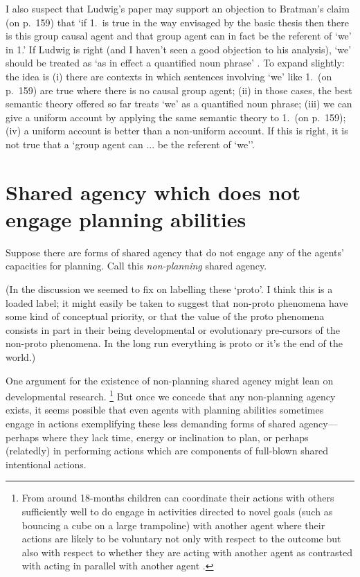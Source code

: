 \documentclass[12pt,letterpaper]{extarticle}
\begin{document}
I also suspect that Ludwig's paper may support an objection to Bratman's claim (on p.\ 159) that `if 1.\ is true in the way envisaged by the basic thesis then there is this group causal agent and that group agent can in fact be the referent of `we' in 1.'
If Ludwig is right (and I haven't seen a good objection to his analysis), `we' should be treated as `as in effect a quantified noun phrase' \citep[p.\ 364]{ludwig_collective_2007}.
To expand slightly: the idea is (i) there are contexts in which sentences involving `we' like 1.\ (on p.\ 159) are true where there is no causal group agent; (ii) in those cases, the best semantic theory offered so far treats `we' as a quantified noun phrase; (iii) we can give a uniform account by applying the same semantic theory to 1.\ (on p.\ 159); (iv) a uniform account is better than a non-uniform account.
If this is right, it is not true that a `group agent can ... be the referent of `we''.



\section{Shared agency which does not engage planning abilities}

Suppose there are forms of shared agency that do not engage any of the agents' capacities for planning.  
Call this \emph{non-planning} shared agency.

(In the discussion we seemed to fix on labelling these `proto'.
I think this is a loaded label; it might easily be taken to suggest that non-proto phenomena have some kind of conceptual priority, or that the value of the proto phenomena consists in part in their being developmental or evolutionary pre-cursors of the non-proto phenomena.
In the long run everything is proto or it's the end of the world.)

One argument for the existence of non-planning shared agency might lean on developmental research.%
%
\footnote{
From around 18-months children can coordinate their actions with others sufficiently well to do engage in activities directed to novel goals (such as bouncing a cube on a large trampoline) with another agent \citep{Warneken:2006qe} where their actions are likely to be voluntary not only with respect to the outcome but also with respect to whether they are acting with another agent as contrasted with acting in parallel with another agent \citep{Grafenhain:2010zl}.
} 
%
But once we concede that any non-planning agency exists, it seems possible that even agents with planning abilities  sometimes engage in actions exemplifying these less demanding forms of shared agency---perhaps where they lack time, energy or inclination to plan, or perhaps (relatedly) in performing actions which are components of full-blown shared intentional actions.
\end{document}
